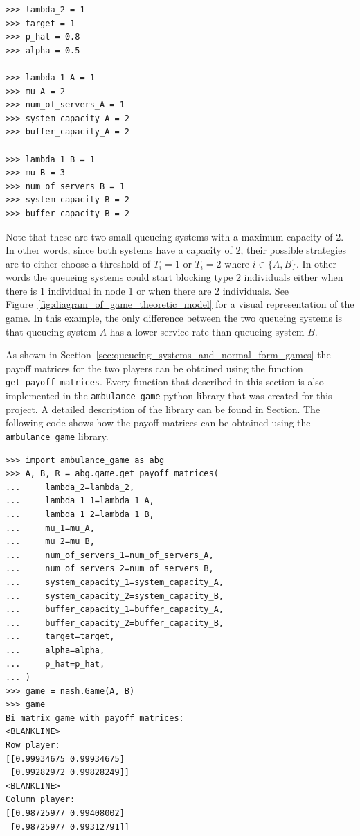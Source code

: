 \begin{lstlisting}[style=pystyle]
>>> lambda_2 = 1
>>> target = 1
>>> p_hat = 0.8
>>> alpha = 0.5

>>> lambda_1_A = 1
>>> mu_A = 2
>>> num_of_servers_A = 1
>>> system_capacity_A = 2
>>> buffer_capacity_A = 2
    
>>> lambda_1_B = 1
>>> mu_B = 3
>>> num_of_servers_B = 1
>>> system_capacity_B = 2
>>> buffer_capacity_B = 2

\end{lstlisting}

Note that these are two small queueing systems with a maximum capacity of \(2\).
In other words, since both systems have a capacity of \(2\), their possible
strategies are to either choose a threshold of \(T_i = 1\) or \(T_i = 2\) where
\(i \in \{A, B\}\).
In other words the queueing systems could start blocking type \(2\) individuals
either when there is \(1\) individual in node 1 or when there are \(2\)
individuals.
See Figure~\ref{fig:diagram_of_game_theoretic_model} for a visual representation
of the game.
In this example, the only difference between the two queueing systems
is that queueing system \(A\) has a lower service rate than queueing system
\(B\).

As shown in Section~\ref{sec:queueing_systems_and_normal_form_games} the payoff
matrices for the two players can be obtained using the function
\lstinline[style=pystyle]{get_payoff_matrices}.
Every function that described in this section is also implemented in the
\lstinline[style=pystyle]{ambulance_game} python library that was created for
this project.
A detailed description of the library can be found in Section.
The following code shows how the payoff matrices can be obtained using the
\lstinline[style=pystyle]{ambulance_game} library.

\begin{lstlisting}[style=pystyle]
>>> import ambulance_game as abg
>>> A, B, R = abg.game.get_payoff_matrices(
...     lambda_2=lambda_2,
...     lambda_1_1=lambda_1_A,
...     lambda_1_2=lambda_1_B,
...     mu_1=mu_A,
...     mu_2=mu_B,
...     num_of_servers_1=num_of_servers_A,
...     num_of_servers_2=num_of_servers_B,
...     system_capacity_1=system_capacity_A,
...     system_capacity_2=system_capacity_B,
...     buffer_capacity_1=buffer_capacity_A,
...     buffer_capacity_2=buffer_capacity_B,
...     target=target,
...     alpha=alpha,
...     p_hat=p_hat,
... )
>>> game = nash.Game(A, B)
>>> game
Bi matrix game with payoff matrices:
<BLANKLINE>
Row player:
[[0.99934675 0.99934675]
 [0.99282972 0.99828249]]
<BLANKLINE>
Column player:
[[0.98725977 0.99408002]
 [0.98725977 0.99312791]]

\end{lstlisting}

